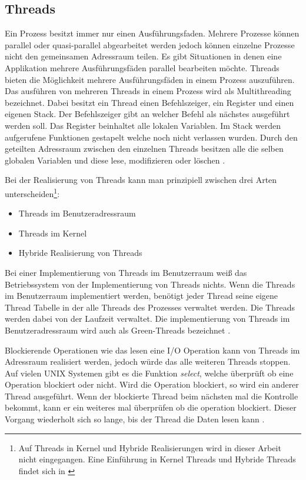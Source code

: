 \subsection{Threads}
\label{section: Threads}
Ein Prozess besitzt immer nur einen Ausführungsfaden. Mehrere Prozesse können parallel oder quasi-parallel abgearbeitet werden jedoch können einzelne Prozesse nicht den gemeinsamen Adressraum teilen. Es gibt Situationen in denen eine Applikation mehrere Ausführungsfäden parallel bearbeiten möchte. Threads bieten die Möglichkeit mehrere Ausführungsfäden in einem Prozess auszuführen. Das ausführen von mehreren Threads in einem Prozess wird als Multithreading bezeichnet. Dabei besitzt ein Thread einen Befehlszeiger, ein Register und einen eigenen Stack. Der Befehlszeiger gibt an welcher Befehl als nächstes ausgeführt werden soll. Das Register beinhaltet alle lokalen Variablen. Im Stack werden aufgerufene Funktionen gestapelt welche noch nicht verlassen wurden. Durch den geteilten Adressraum zwischen den einzelnen Threads besitzen alle die selben globalen Variablen und diese lese, modifizieren oder löschen \cite[p. 97]{tan09}. 

Bei der Realisierung von Threads kann man prinzipiell zwischen drei Arten unterscheiden\footnote{Auf Threads in Kernel und Hybride Realisierungen wird in dieser Arbeit nicht eingegangen. Eine Einführung in Kernel Threads und Hybride Threads findet sich in \cite[p. 109-110]{tan09}}:

\begin{itemize}
  \item Threads im Benutzeradressraum
  \item Threads im Kernel 
  \item Hybride Realisierung von Threads
\end{itemize}

Bei einer Implementierung von Threads im Benutzerraum weiß das Betriebssystem von der Implementierung von Threads nichts. Wenn die Threads im Benutzerraum implementiert werden, benötigt jeder Thread seine eigene Thread Tabelle in der alle Threads des Prozesses verwaltet werden. Die Threads werden dabei von der Laufzeit verwaltet. Die implementierung von Threads im Benutzeradressraum wird auch als Green-Threads bezeichnet \cite[p. 106]{tan09}.

Blockierende Operationen wie das lesen eine I/O Operation kann von Threads im Adressraum realisiert werden, jedoch würde das alle weiteren Threads stoppen. Auf vielen UNIX Systemen gibt es die Funktion \emph{select}, welche überprüft ob eine Operation blockiert oder nicht. Wird die Operation blockiert, so wird ein anderer Thread ausgeführt. Wenn der blockierte Thread beim nächsten mal die Kontrolle bekommt, kann er ein weiteres mal überprüfen ob die operation blockiert. Dieser Vorgang wiederholt sich so lange, bis der Thread die Daten lesen kann \cite[p. 108]{tan09}. 


